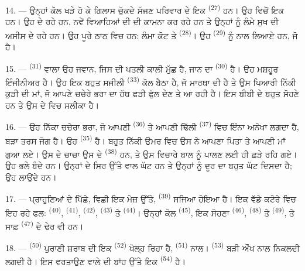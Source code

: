 14. --- ਉਨ੍ਹਾਂ ਕੋਲ ਖੜੇ ਹੋ ਕੇ ਗਿਲਾਸ ਚੁੱਕਦੇ ਸੱਜਣ ਪਰਿਵਾਰ ਦੇ ਇਕ 
\textsuperscript{(27)} ਹਨ। ਉਹ  ਵਿਚੋਂ ਇਕ ਹਨ। ਉਹ
 ਦੇ ਰਹੇ ਹਨ, ਨਵੇਂ ਵਿਆਹਿਆਂ ਦੀ  ਦੀ ਕਾਮਨਾ ਕਰ ਰਹੇ ਹਨ ਤੇ
ਉਨ੍ਹਾਂ ਨੂੰ ਲੰਮੇ ਸੁਖ ਦੀ ਅਸੀਸ ਦੇ ਰਹੇ ਹਨ। ਉਹ ਪੂਰੇ ਠਾਠ ਵਿਚ ਹਨ: ਲੰਮਾ ਕੋਟ ਤੇ
 \textsuperscript{(28)}। ਉਹ 
\textsuperscript{(29)} ਨੂੰ ਨਾਲ ਲਿਆਏ ਹਨ, ਜੋ  ਹੈ।

15. ---  \textsuperscript{(31)} ਵਾਲਾ ਉਹ ਜਵਾਨ, ਜਿਸ ਦੀ ਪਤਲੀ ਕਾਲੀ
ਮੁੱਛ ਹੈ, ਜਾਨ ਦਾ  \textsuperscript{(30)} ਹੈ। ਉਹ ਮਸ਼ਹੂਰ ਇੰਜੀਨੀਅਰ ਹੈ।
ਉਹ ਇਕ ਬਹੁਤ ਸਜੀਲੀ  \textsuperscript{(33)} ਕੋਲ ਬੈਠਾ ਹੈ, ਜੋ ਮਾਰਥਾ ਦੀ
 ਹੈ ਤੇ ਉਸ ਪਿਆਰੀ ਨਿੱਕੀ ਕੁੜੀ ਦੀ ਮਾਂ, ਜੋ ਆਪਣੇ ਚਚੇਰੇ ਭਰਾ ਦਾ ਹੱਥ
ਫੜੀ ਫੁੱਲ ਦੇਣ ਤੇ   ਆ ਰਹੀ ਹੈ। ਇਸ ਬੀਬੀ ਦੇ
 ਬਹੁਤ ਸੋਹਣੇ ਹਨ ਤੇ ਉਸ ਦੇ  ਵਿਚ ਸਲੀਕਾ
ਹੈ।

16. --- ਉਹ ਨਿੱਕਾ ਚਚੇਰਾ ਭਰਾ, ਜੋ ਆਪਣੀ  \textsuperscript{(36)} ਤੇ
ਆਪਣੀ ਢਿੱਲੀ  \textsuperscript{(37)} ਵਿਚ ਇੰਨਾ ਅਨੋਖਾ ਲਗਦਾ ਹੈ, ਬੜਾ ਤਰਸ
ਜੋਗ ਹੈ। ਉਹ  \textsuperscript{(35)} ਹੈ। ਬਹੁਤ ਨਿੱਕੀ ਉਮਰ ਵਿਚ ਉਸ ਨੇ ਆਪਣਾ
ਪਿਤਾ ਤੇ ਆਪਣੀ ਮਾਂ ਗੁਆ ਲਏ। ਉਸ ਦੇ ਚਾਚਾ ਉਸ ਦੇ  \textsuperscript{(38)}
ਹਨ, ਤੇ ਉਸ ਵਿਚਾਰੇ ਬਾਲ ਨੂੰ ਪਾਲਣ ਲਈ ਹੀ ਛੜੇ ਰਹਿ ਗਏ। ਉਹ ਭਲੇ ਬੰਦੇ ਹਨ। ਉਨ੍ਹਾਂ ਦੇ ਸਿਰ
ਉੱਤੇ ਵਾਲ ਘੱਟ ਹਨ ਤੇ ਉਨ੍ਹਾਂ ਨੂੰ ਦੂਰ ਦਾ ਬਹੁਤ ਘੱਟ ਦਿਸਦਾ ਹੈ; ਉਹ 
ਲਾਉਂਦੇ ਹਨ।

\VUsaut{2.4mm}
\VUsaut{3.0mm}

17. --- ਪ੍ਰਾਹੁਣਿਆਂ ਦੇ ਪਿੱਛੇ,  ਵਿਛੀ ਇਕ ਮੇਜ਼ ਉੱਤੇ, 
\textsuperscript{(39)} ਸਜਿਆ ਹੋਇਆ ਹੈ। ਇਕ ਵੱਡੇ ਕਟੋਰੇ ਵਿਚ ਇਹ ਰਹੇ ਫਲ:
 \textsuperscript{(40)},  \textsuperscript{(41)},
 \textsuperscript{(42)},  \textsuperscript{(43)} ਤੇ
 \textsuperscript{(44)}। ਉਨ੍ਹਾਂ ਕੋਲ 
\textsuperscript{(45)}, ਇਕ ਸੋਹਣਾ  \textsuperscript{(46)},
 \textsuperscript{(48)} ਤੇ 
\textsuperscript{(49)}, ਤੇ ਸਾਫ਼  \textsuperscript{(47)} ਦੇ ਢੇਰ ਵੀ ਹਨ।

18. ---  \textsuperscript{(50)} ਪੁਰਾਣੀ ਸ਼ਰਾਬ ਦੀ ਇਕ
 \textsuperscript{(52)} ਖੋਲ੍ਹ ਰਿਹਾ ਹੈ, 
\textsuperscript{(51)} ਨਾਲ।  \textsuperscript{(53)} ਬੜੀ ਔਖ ਨਾਲ ਨਿਕਲਦੀ
ਲਗਦੀ ਹੈ। ਇਸ ਵਰਤਾਉਣ ਵਾਲੇ ਦੀ ਬਾਂਹ ਉੱਤੇ ਇਕ  \textsuperscript{(54)} ਹੈ।

